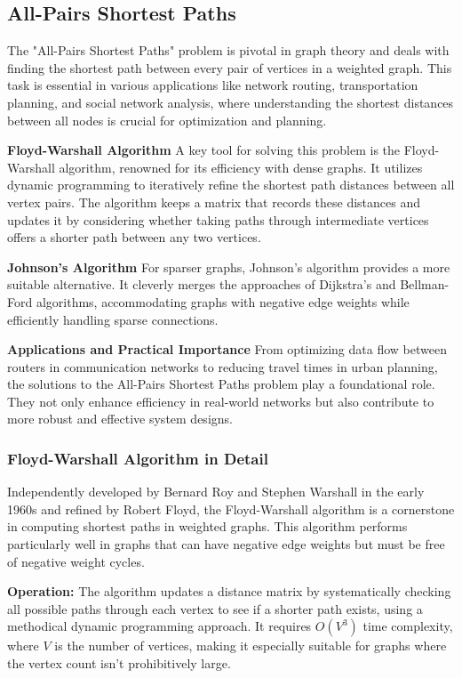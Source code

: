 \documentclass[12pt]{book} %
\begin{document}
\subsection{All-Pairs Shortest Paths}
The "All-Pairs Shortest Paths" problem is pivotal in graph theory and deals with finding the shortest path between every pair of vertices in a weighted graph. This task is essential in various applications like network routing, transportation planning, and social network analysis, where understanding the shortest distances between all nodes is crucial for optimization and planning.

\textbf{Floyd-Warshall Algorithm}
A key tool for solving this problem is the Floyd-Warshall algorithm, renowned for its efficiency with dense graphs. It utilizes dynamic programming to iteratively refine the shortest path distances between all vertex pairs. The algorithm keeps a matrix that records these distances and updates it by considering whether taking paths through intermediate vertices offers a shorter path between any two vertices.

\textbf{Johnson's Algorithm}
For sparser graphs, Johnson's algorithm provides a more suitable alternative. It cleverly merges the approaches of Dijkstra’s and Bellman-Ford algorithms, accommodating graphs with negative edge weights while efficiently handling sparse connections.

\textbf{Applications and Practical Importance}
From optimizing data flow between routers in communication networks to reducing travel times in urban planning, the solutions to the All-Pairs Shortest Paths problem play a foundational role. They not only enhance efficiency in real-world networks but also contribute to more robust and effective system designs.

\subsubsection{Floyd-Warshall Algorithm in Detail}
Independently developed by Bernard Roy and Stephen Warshall in the early 1960s and refined by Robert Floyd, the Floyd-Warshall algorithm is a cornerstone in computing shortest paths in weighted graphs. This algorithm performs particularly well in graphs that can have negative edge weights but must be free of negative weight cycles.

\textbf{Operation:}
The algorithm updates a distance matrix by systematically checking all possible paths through each vertex to see if a shorter path exists, using a methodical dynamic programming approach. It requires \(O(V^3)\) time complexity, where \(V\) is the number of vertices, making it especially suitable for graphs where the vertex count isn't prohibitively large.
\end{document}
